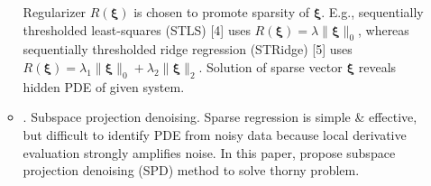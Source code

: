 \documentclass{article}
\begin{document}
\begin{itemize}
\begin{itemize}
\begin{equation}
		\end{equation}
		Regularizer $R(\boldsymbol{\xi})$ is chosen to promote sparsity of $\boldsymbol{\xi}$. E.g., sequentially thresholded least-squares (STLS) [4] uses $R(\boldsymbol{\xi}) = \lambda\|\boldsymbol{\xi}\|_0$, whereas sequentially thresholded ridge regression (STRidge) [5] uses $R(\boldsymbol{\xi}) = \lambda_1\|\boldsymbol{\xi}\|_0 + \lambda_2\|\boldsymbol{\xi}\|_2$. Solution of sparse vector $\boldsymbol{\xi}$ reveals hidden PDE of given system.
		\item {. Subspace projection denoising.} Sparse regression is simple \& effective, but difficult to identify PDE from noisy data because local derivative evaluation strongly amplifies noise. In this paper, propose subspace projection denoising (SPD) method to solve thorny problem.
		

\end{itemize}
\end{itemize}
\end{document}

